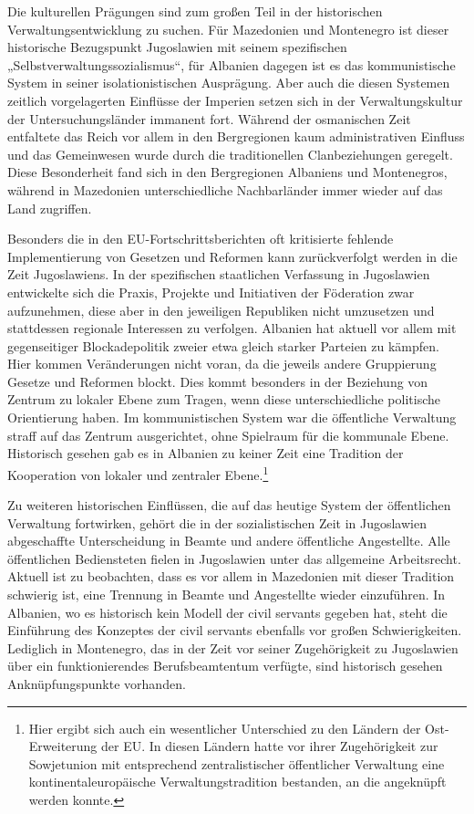 Die kulturellen Prägungen sind zum großen Teil in der historischen Verwaltungsentwicklung zu suchen. Für Mazedonien und Montenegro ist dieser historische Bezugspunkt Jugoslawien mit seinem spezifischen „Selbstverwaltungssozialismus“, für Albanien dagegen ist es das kommunistische System in seiner isolationistischen Ausprägung. Aber auch die diesen Systemen zeitlich vorgelagerten Einflüsse der Imperien setzen sich in der Verwaltungskultur der Untersuchungsländer immanent fort. Während der osmanischen Zeit entfaltete das Reich vor allem in den Bergregionen kaum administrativen Einfluss und das Gemeinwesen wurde durch die traditionellen Clanbeziehungen geregelt. Diese Besonderheit fand sich in den Bergregionen Albaniens und Montenegros, während in Mazedonien unterschiedliche Nachbarländer immer wieder auf das Land zugriffen.\par
Besonders die in den EU-Fortschrittsberichten oft kritisierte fehlende Implementierung von Gesetzen und Reformen kann zurückverfolgt werden in die Zeit Jugoslawiens. In der spezifischen staatlichen Verfassung in Jugoslawien entwickelte sich die Praxis, Projekte und Initiativen der Föderation zwar aufzunehmen, diese aber in den jeweiligen Republiken nicht umzusetzen und stattdessen regionale Interessen zu verfolgen. Albanien hat aktuell vor allem mit gegenseitiger Blockadepolitik zweier etwa gleich starker Parteien zu kämpfen. Hier kommen Veränderungen nicht voran, da die jeweils andere Gruppierung Gesetze und Reformen blockt. Dies kommt besonders in der Beziehung von Zentrum zu lokaler Ebene zum Tragen, wenn diese unterschiedliche politische Orientierung haben. Im kommunistischen System war die öffentliche Verwaltung straff auf das Zentrum ausgerichtet, ohne Spielraum für die kommunale Ebene. Historisch gesehen gab es in Albanien zu keiner Zeit eine Tradition der Kooperation von lokaler und zentraler Ebene.\footnote{Hier ergibt sich auch ein wesentlicher Unterschied zu den Ländern der Ost-Erweiterung der EU. In diesen Ländern hatte vor ihrer Zugehörigkeit zur Sowjetunion mit entsprechend zentralistischer öffentlicher Verwaltung eine kontinentaleuropäische Verwaltungstradition bestanden, an die angeknüpft werden konnte.
}\par
Zu weiteren historischen Einflüssen, die auf das heutige System der öffentlichen Verwaltung fortwirken, gehört die in der sozialistischen Zeit in Jugoslawien abgeschaffte Unterscheidung in Beamte und andere öffentliche Angestellte. Alle öffentlichen Bediensteten fielen in Jugoslawien unter das allgemeine Arbeitsrecht. Aktuell ist zu beobachten, dass es vor allem in Mazedonien mit dieser Tradition schwierig ist, eine Trennung in Beamte und Angestellte wieder einzuführen. In Albanien, wo es historisch kein Modell der civil servants gegeben hat, steht die Einführung des Konzeptes der civil servants ebenfalls vor großen Schwierigkeiten. Lediglich in Montenegro, das in der Zeit vor seiner Zugehörigkeit zu Jugoslawien über ein funktionierendes Berufsbeamtentum verfügte, sind historisch gesehen Anknüpfungspunkte vorhanden. \par
